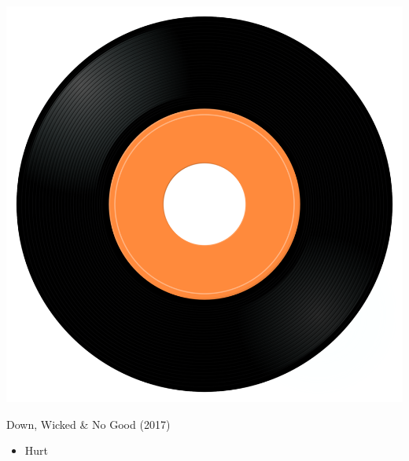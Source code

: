 \begin{minipage}[t]{0.25\textwidth}\vspace{0pt}
\captionsetup{type=figure}
\includegraphics[width=\textwidth]{Images/cover.png}
\caption*{Down, Wicked \& No Good (2017)}
\end{minipage}
\begin{minipage}[t]{0.25\textwidth}\vspace{0pt}
\begin{itemize}[nosep,leftmargin=1em,labelwidth=*,align=left]
	\setlength{\itemsep}{0pt}
	\item Hurt
\end{itemize}
\end{minipage}

